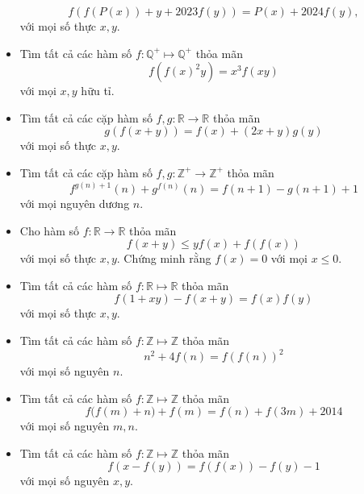 \documentclass[11pt]{scrartcl}
\begin{document}
\begin{itemize}[label=, leftmargin=0em, itemsep=-0em]
\begin{btvn}
        $$f(f(P(x))+y+2023f(y))=P(x)+2024f(y),$$
        với mọi số thực $x,y$.
    \end{btvn}
    \item \begin{btvn}
        Tìm tất cả các hàm số $f : \mathbb{Q}^+ \mapsto \mathbb{Q}^+$ thỏa mãn
        \[f\left( f(x)^2y \right) = x^3 f(xy)\]
        với mọi $x,y$ hữu tỉ.
    \end{btvn}
    \item \begin{btvn}
        Tìm tất cả các cặp hàm số $f,g: \mathbb{R} \to \mathbb{R}$ thỏa mãn
        \[g(f(x+y)) = f(x) + (2x + y)g(y)\]
        với mọi số thực $x,y$.
    \end{btvn}
    \item \begin{btvn}
        Tìm tất cả các cặp hàm số $f,g: \mathbb{Z}^+ \to \mathbb{Z}^+$ thỏa mãn
        \[f^{g(n)+1}(n) + g^{f(n)}(n) = f(n+1) - g(n+1) + 1\]
        với mọi nguyên dương $n$.
    \end{btvn}
    \item \begin{btvn}
        Cho hàm số $f: \mathbb{R} \to \mathbb{R}$ thỏa mãn
        \[f(x + y) \leq yf(x) + f(f(x))\]
        với mọi số thực $x,y$. Chứng minh rằng $f(x) = 0$ với mọi $x \leq 0$.
    \end{btvn}
    \item \begin{btvn}
        Tìm tất cả các hàm số $f : \mathbb{R} \mapsto \mathbb{R}$ thỏa mãn
        \[f(1+xy)-f(x+y)=f(x)f(y) \]
        với mọi số thực $x,y$.
    \end{btvn}
    \item \begin{btvn}
        Tìm tất cả các hàm số $f : \mathbb{Z} \mapsto \mathbb{Z}$ thỏa mãn
        \[ n^2+4f(n)=f(f(n))^2 \]
        với mọi số nguyên $n$.
    \end{btvn}
    \item \begin{btvn}
        Tìm tất cả các hàm số $f : \mathbb{Z} \mapsto \mathbb{Z}$ thỏa mãn
        \[f\big(f(m)+n\big)+f(m)=f(n)+f(3m)+2014\]
        với mọi số nguyên $m,n$.
    \end{btvn}
    \item \begin{btvn}
        Tìm tất cả các hàm số $f : \mathbb{Z} \mapsto \mathbb{Z}$ thỏa mãn
        \[f(x-f(y))=f(f(x))-f(y)-1\]
        với mọi số nguyên $x,y$.
    \end{btvn}


\end{itemize}
\end{document}

